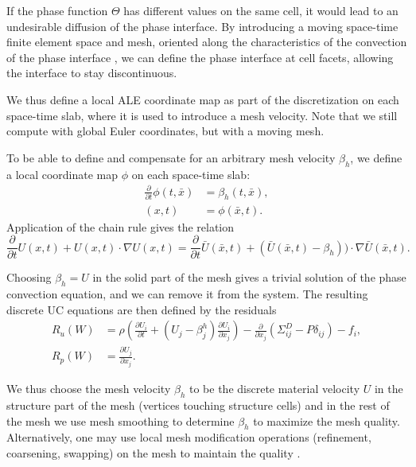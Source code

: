 If the phase function $\Theta$ has different values on the same cell,
it would lead to an undesirable diffusion of the phase interface. By
introducing a moving space-time finite element space and mesh,
oriented along the characteristics of the convection of the phase
interface \citep[section concerning ``The characteristic Galerkin
  method'']{ErikssonEstepHansboEtAl1996}, we can define the phase
interface at cell facets, allowing the interface to stay
discontinuous.

We thus define a local ALE coordinate map as part of the
discretization on each space-time slab, where it is used to introduce
a mesh velocity. Note that we still compute with global Euler
coordinates, but with a moving mesh.

To be able to define and compensate for an arbitrary mesh velocity
$\beta_h$, we define a local coordinate map $\phi$ on each space-time
slab:
\begin{equation}
  \begin{split}\label{eq:ALEmap}
    \frac{\partial}{\partial t} \phi(t, \bar{x}) &= \beta_h(t, \bar{x}),
    \\
    (x, t) &= \phi(\bar{x}, t).
  \end{split}
\end{equation}
Application of the chain rule gives the relation
\begin{equation}
  \label{eq:ALE2}
  \frac{\partial}{\partial t} U(x,t) + U(x,t) \cdot \nabla U(x,t) = \frac{\partial}{\partial t} \bar{U}(\bar{x},t) +
  (\bar{U}(\bar{x},t) - \beta_h)) \cdot \nabla \bar{U}(\bar{x},t).
\end{equation}

Choosing $\beta_h = U$ in the solid part of the mesh gives a trivial
solution of the phase convection equation, and we can remove it from
the system. The resulting discrete UC equations are then defined by the residuals
\begin{equation}
  \begin{split}\label{eq:ALE}
    R_u(W) &= \rho\left(\frac{\partial U_i}{\partial t} + (U_j - \beta^h_j) \frac{\partial U_i}{\partial x_j} \right) - \frac{\partial}{\partial x_j} (\Sigma^D_{ij} - P \delta_{ij}) - f_i,
    \\
    R_p(W) &= \frac{\partial U_j}{\partial x_j}.
  \end{split}
\end{equation}

We thus choose the mesh velocity $\beta_h$ to be the discrete material
velocity $U$ in the structure part of the mesh (vertices touching
structure cells) and in the rest of the mesh we use mesh smoothing to
determine $\beta_h$ to maximize the mesh quality. Alternatively, one
may use local mesh modification operations (refinement, coarsening,
swapping) on the mesh to maintain the quality
\citep{Comp`ereRemacleJanssonEtAl2009}.

